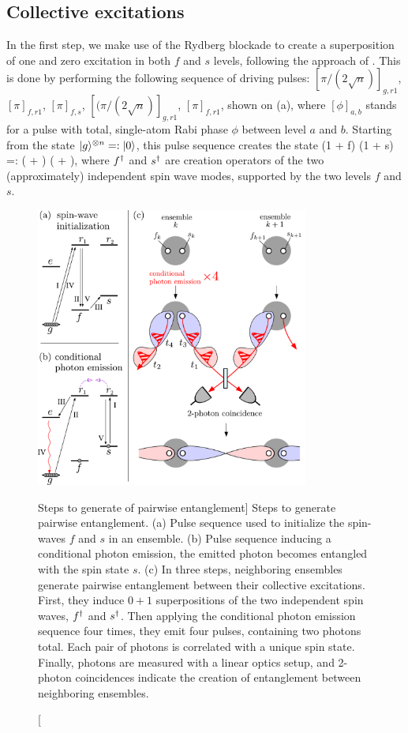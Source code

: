 \subsection{Collective excitations}
In the first step, we make use of the Rydberg blockade to create a superposition
of one and zero excitation in both $f$ and $s$ levels, following the approach of \cite{Lukin2001, Saffman2010,Dudin2012}.
This is done by performing the following sequence of driving pulses:
$[\pi/(2\sqrt{n})]_{g,r1}$, $[\pi]_{f,r1}$, $[\pi]_{f,s}$,
$[(\pi/(2\sqrt{n})]_{g,r1}$, $[\pi]_{f,r1}$, shown
on (a), where $[\phi]_{a,b}$ stands for a
pulse with total, single-atom Rabi phase $\phi$ between level $a$ and $b$.
Starting from the state $| g \rangle^{\otimes n} =: | 0 \rangle$, this pulse sequence creates the state
\bel
\label{eq:step1}
(1 + f\+) (1 + s\+)  =:
\Big( + \Big) \Big( + \Big), 
\eel 
where $f^\dagger$
and $s^\dagger$ are creation operators of the two (approximately) independent spin
wave modes, supported by the two levels $f$ and $s$. 

\begin{figure}
\centering
\includegraphics[width=0.8\textwidth]{./figs_Komar2015/steps123_1.pdf}
\caption
[Steps to generate of pairwise entanglement]
{
\label{fig:steps123}
Steps to generate pairwise entanglement. (a) Pulse
sequence used to initialize the spin-waves $f$ and $s$ in an ensemble.
(b) Pulse sequence inducing a conditional photon emission, the emitted photon
becomes entangled with the spin state $s$. 
(c) In three steps, neighboring ensembles generate pairwise entanglement between
their collective excitations. First, they induce $0+1$ superpositions of the two
independent spin waves, $f^\dagger$ and $s^\dagger$. Then applying the conditional photon
emission sequence four times, they emit four pulses, containing two
photons total. Each pair of photons is correlated with a unique spin state.
Finally, photons are measured with a linear optics setup, and 2-photon coincidences
indicate the creation of entanglement between neighboring ensembles.}
\end{figure}


